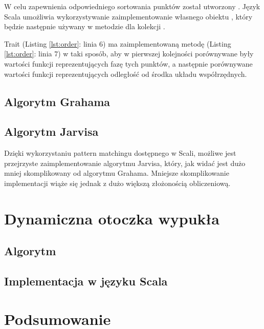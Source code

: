    		W celu zapewnienia odpowiedniego sortowania punktów został utworzony . Język Scala umożliwia wykorzystywanie zaimplementowanie własnego obiektu , który będzie następnie używany w metodzie  dla kolekcji .
   		
   	 	Trait  (Listing \ref{lst:order}: linia 6) ma zaimplementowaną metodę  (Listing \ref{lst:order}: linia 7) w taki sposób, aby w pierwszej kolejności porównywane były wartości funkcji reprezentujących fazę tych punktów, a następnie porównywane wartości funkcji reprezentujących odległość od środka układu współrzędnych.
   		
   		
   		\newpage
   		
   		\newpage
   		
   		\newpage
   		\section{Algorytm Grahama}
   		
   		\newpage
   		
   		\newpage
   		
   		
   		\section{Algorytm Jarvisa}
   		Dzięki wykorzystaniu pattern matchingu dostępnego w Scali, możliwe jest przejrzyste zaimplementowanie algorytmu Jarvisa, który, jak widać jest dużo mniej skomplikowany od algorytmu Grahama. Mniejsze skomplikowanie implementacji wiąże się jednak z dużo większą złożonością obliczeniową.
        
        
    \chapter{Dynamiczna otoczka wypukła}
    	\section{Algorytm}
    	\section{Implementacja w języku Scala} 
	\chapter{Podsumowanie} 
      
    

